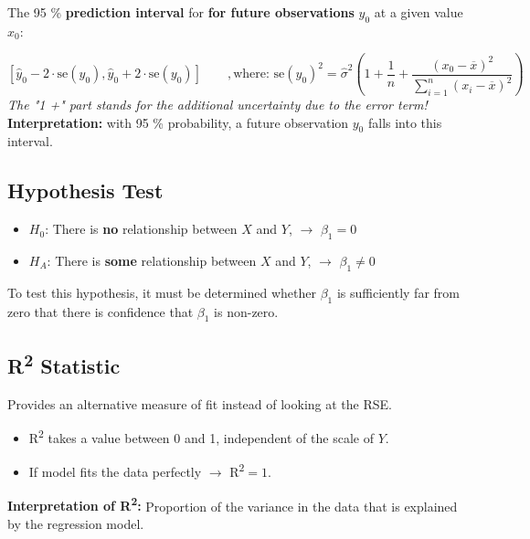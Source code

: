 \documentclass[11pt]{article}
\newcommand*\samplemean[1]{\overline{#1}}
\begin{document}
\begin{definition}
	The 95 \% \textbf{prediction interval} for \textbf{for future observations} $y_0$ at a given value $x_0$:
	
	\begin{equation*}
		\left[ \hat{y}_0 - 2\cdot \text{se}(y_0), \hat{y}_0 + 2\cdot \text{se}(y_0) \right] \qquad, \text{where: } \text{se}(y_0)^2 = \hat{\sigma}^2 \left( 1 + \frac{1}{n}+ \frac{(x_0-\samplemean{x})^2}{\sum_{i=1}^{n}(x_i-\samplemean{x})^2} \right)
	\end{equation*}
	\textit{The "1 +" part stands for the additional uncertainty due to the error term!}\\
	
	\noindent
	\textbf{Interpretation:} with 95 \% probability, a future observation $y_0$ falls into this interval.
\end{definition}

\subsection{Hypothesis Test}
\begin{itemize}[noitemsep]
	\item $H_0$: There is \textbf{no} relationship between $X$ and $Y$, \quad $\rightarrow$ $\beta_1 = 0$
	\item $H_A$: There is \textbf{some} relationship between $X$ and $Y$, \quad $\rightarrow$ $\beta_1 \neq 0$
\end{itemize}
To test this hypothesis, it must be determined whether $\beta_1$ is sufficiently far from zero that there is confidence that $\beta_1$ is non-zero.


\subsection{R\textsuperscript{2} Statistic}
Provides an alternative measure of fit instead of looking at the RSE.

\begin{itemize}[noitemsep]
	\item R\textsuperscript{2} takes a value between 0 and 1, independent of the scale of $Y$.
	\item If model fits the data perfectly $\rightarrow$ R\textsuperscript{2}$=1$.
\end{itemize}

\noindent
\textbf{Interpretation of R\textsuperscript{2}:} Proportion of the variance in the data that is explained by the regression model.
\end{document}
